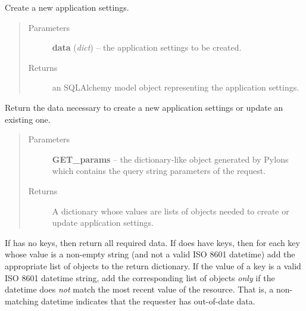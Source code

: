 \documentclass[letterpaper,10pt,english]{sphinxmanual}
\begin{document}

\begin{fulllineitems}
\label{api:onlinelinguisticdatabase.controllers.applicationsettings.createNewApplicationSettings}
Create a new application settings.
\begin{quote}\begin{description}
\item[{Parameters}] \leavevmode
\textbf{data} (\emph{dict}) -- the application settings to be created.

\item[{Returns}] \leavevmode
an SQLAlchemy model object representing the application settings.

\end{description}\end{quote}

\end{fulllineitems}


\begin{fulllineitems}
\label{api:onlinelinguisticdatabase.controllers.applicationsettings.getNewApplicationSettingsData}
Return the data necessary to create a new application settings or update an existing one.
\begin{quote}\begin{description}
\item[{Parameters}] \leavevmode
\textbf{GET\_params} -- the  dictionary-like object generated by
Pylons which contains the query string parameters of the request.

\item[{Returns}] \leavevmode
A dictionary whose values are lists of objects needed to create or
update application settings.

\end{description}\end{quote}

If  has no keys, then return all required data.  If
 does have keys, then for each key whose value is a non-empty
string (and not a valid ISO 8601 datetime) add the appropriate list of
objects to the return dictionary.  If the value of a key is a valid ISO 8601
datetime string, add the corresponding list of objects \emph{only} if the
datetime does \emph{not} match the most recent  value of the
resource.  That is, a non-matching datetime indicates that the requester has
out-of-date data.

\end{fulllineitems}
\end{document}
